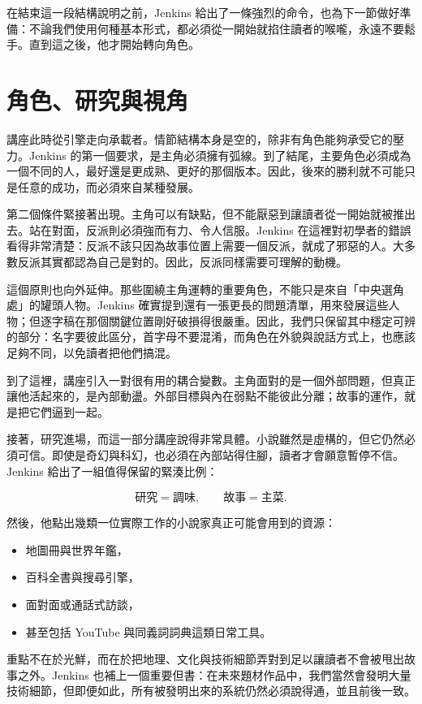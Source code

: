 在結束這一段結構說明之前，Jenkins 給出了一條強烈的命令，也為下一節做好準備：不論我們使用何種基本形式，都必須從一開始就掐住讀者的喉嚨，永遠不要鬆手。直到這之後，他才開始轉向角色。

\section{角色、研究與視角}

講座此時從引擎走向承載者。情節結構本身是空的，除非有角色能夠承受它的壓力。Jenkins 的第一個要求，是主角必須擁有弧線。到了結尾，主要角色必須成為一個不同的人，最好還是更成熟、更好的那個版本。因此，後來的勝利就不可能只是任意的成功，而必須來自某種發展。

第二個條件緊接著出現。主角可以有缺點，但不能厭惡到讓讀者從一開始就被推出去。站在對面，反派則必須強而有力、令人信服。Jenkins 在這裡對初學者的錯誤看得非常清楚：反派不該只因為故事位置上需要一個反派，就成了邪惡的人。大多數反派其實都認為自己是對的。因此，反派同樣需要可理解的動機。

這個原則也向外延伸。那些圍繞主角運轉的重要角色，不能只是來自「中央選角處」的罐頭人物。Jenkins 確實提到還有一張更長的問題清單，用來發展這些人物；但逐字稿在那個關鍵位置剛好破損得很嚴重。因此，我們只保留其中穩定可辨的部分：名字要彼此區分，首字母不要混淆，而角色在外貌與說話方式上，也應該足夠不同，以免讀者把他們搞混。

到了這裡，講座引入一對很有用的耦合變數。主角面對的是一個外部問題，但真正讓他活起來的，是內部動盪。外部目標與內在弱點不能彼此分離；故事的運作，就是把它們逼到一起。

接著，研究進場，而這一部分講座說得非常具體。小說雖然是虛構的，但它仍然必須可信。即使是奇幻與科幻，也必須在內部站得住腳，讀者才會願意暫停不信。Jenkins 給出了一組值得保留的緊湊比例：

\begin{equation}
\text{研究}=\text{調味},\qquad \text{故事}=\text{主菜}.
\end{equation}

然後，他點出幾類一位實際工作的小說家真正可能會用到的資源：

\begin{itemize}
\item 地圖冊與世界年鑑，
\item 百科全書與搜尋引擎，
\item 面對面或通話式訪談，
\item 甚至包括 YouTube 與同義詞詞典這類日常工具。
\end{itemize}

重點不在於光鮮，而在於把地理、文化與技術細節弄對到足以讓讀者不會被甩出故事之外。Jenkins 也補上一個重要但書：在未來題材作品中，我們當然會發明大量技術細節，但即便如此，所有被發明出來的系統仍然必須說得通，並且前後一致。


